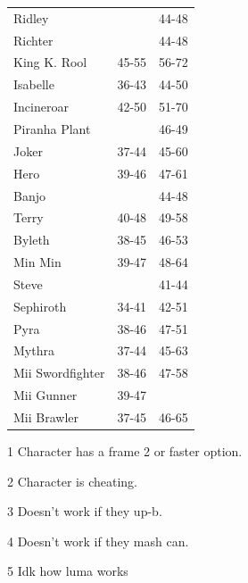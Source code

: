 \begin{table}[h]
\begin{subtable}[t]{.45\linewidth}
\begin{threeparttable}
\begin{tabular}{lcc}
            Ridley            &        & 44-48 \\
            Richter           &        & 44-48 \\
            King K. Rool      & 45-55  & 56-72 \\
            Isabelle          & 36-43  & 44-50 \\
            Incineroar        & 42-50  & 51-70 \\
            Piranha Plant     &        & 46-49 \\
            Joker             & 37-44  & 45-60 \\
            Hero              & 39-46  & 47-61 \\
            Banjo             &        & 44-48 \\
            Terry             & 40-48  & 49-58 \\
            Byleth            & 38-45  & 46-53 \\
            Min Min           & 39-47  & 48-64 \\
            Steve             &        & 41-44 \\
            Sephiroth         & 34-41  & 42-51 \\
            Pyra              & 38-46  & 47-51 \\
            Mythra            & 37-44\tnote{1} & 45-63 \\
            Mii Swordfighter  & 38-46  & 47-58 \\
            Mii Gunner        & 39-47  &       \\
            Mii Brawler       & 37-45\tnote{1} & 46-65 \\
            \bottomrule
        \end{tabular}
        \begin{tablenotes}
            \item[1] Character has a frame 2 or faster option.
            \item[2] Character is cheating.
            \item[3] Doesn't work if they up-b.
            \item[4] Doesn't work if they mash can.
            \item[5] Idk how luma works
        \end{tablenotes}
        \end{threeparttable}
    \end{subtable}
\end{table}

